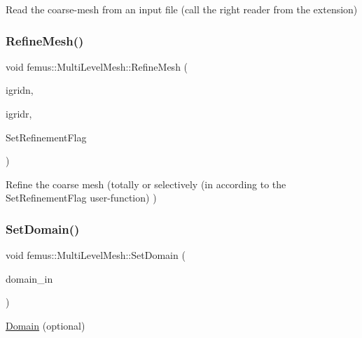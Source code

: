 Read the coarse-\/mesh from an input file (call the right reader from the extension) \mbox{\label{classfemus_1_1_multi_level_mesh_a06c4fe014434c2bafdd2c6e94e018620}} 
\subsubsection{\texorpdfstring{Refine\+Mesh()}{RefineMesh()}}
{\footnotesize\ttfamily void femus\+::\+Multi\+Level\+Mesh\+::\+Refine\+Mesh (\begin{DoxyParamCaption}\item[{const unsigned short \&}]{igridn,  }\item[{const unsigned short \&}]{igridr,  }\item[{bool($\ast$)(const std\+::vector$<$ double $>$ \&x, const int \&Elem\+Group\+Number, const int \&level)}]{Set\+Refinement\+Flag }\end{DoxyParamCaption})}

Refine the coarse mesh (totally or selectively (in according to the Set\+Refinement\+Flag user-\/function) ) \mbox{\label{classfemus_1_1_multi_level_mesh_a1ecf10a71cc3a93dd89ded57adf55043}} 
\subsubsection{\texorpdfstring{Set\+Domain()}{SetDomain()}}
{\footnotesize\ttfamily void femus\+::\+Multi\+Level\+Mesh\+::\+Set\+Domain (\begin{DoxyParamCaption}\item[{\mbox{\hyperlink{classfemus_1_1_domain}{Domain}} $\ast$}]{domain\+\_\+in }\end{DoxyParamCaption})}

\mbox{\hyperlink{classfemus_1_1_domain}{Domain}} (optional) \mbox{\label{classfemus_1_1_multi_level_mesh_a90af74edd9ccffa09e9f963d0f15d923}} 
